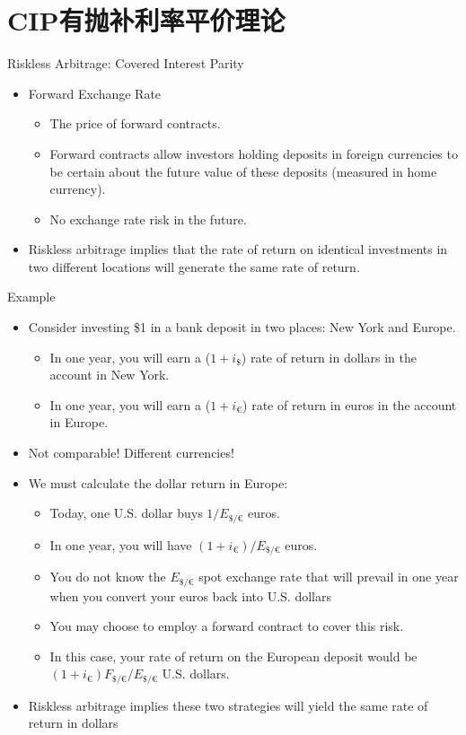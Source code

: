 \documentclass[10pt,hyperref={CJKbookmarks=true},xcolor=dvipsnames,aspectratio=169]{beamer}
\begin{document}
\section{CIP有抛补利率平价理论}

\begin{frame}{Riskless Arbitrage: Covered Interest Parity}
\begin{itemize}
	\item Forward Exchange Rate
	\begin{itemize}
		\item The price of forward contracts.
		\item Forward contracts allow investors holding deposits in foreign currencies to be certain about the future value of these deposits (measured in home currency).
		\item No exchange rate risk in the future.		
	\end{itemize}
	\item Riskless arbitrage implies that the rate of return on identical investments in two different locations will generate the same rate of return.
	
\end{itemize}
\end{frame}

\begin{frame}{Example}
\begin{itemize}
	\item Consider investing \$1 in a bank deposit in two places: New York and Europe.
	
	\begin{itemize}
		\item In one year, you will earn a ($1+i_\$$) rate of return in dollars in the account in New York.
		\item In one year, you will earn a ($1+i_€$) rate of return in euros in the account in Europe.
		
	\end{itemize}
	\item Not comparable! Different currencies!
	\item We must calculate the dollar return in Europe:
		\begin{itemize}
		\item Today, one U.S. dollar buys $1/ E_{\$/€}$  euros.
		\item In one year, you will have $(1+i_€)/E_{\$/€}$ euros.
		\item You do not know the $E_{\$/€}$ spot exchange rate that will prevail in one year when you convert your euros back into U.S. dollars
		\item You may choose to employ a forward contract to cover this risk.
		\item In this case, your rate of return on the European deposit would be $(1+i_€)F_{\$/€}/E_{\$/€}$ U.S. dollars.		
	\end{itemize}
	\item Riskless arbitrage implies these two strategies will yield the same rate of return in dollars
\end{itemize}
\end{frame}
\end{document}
